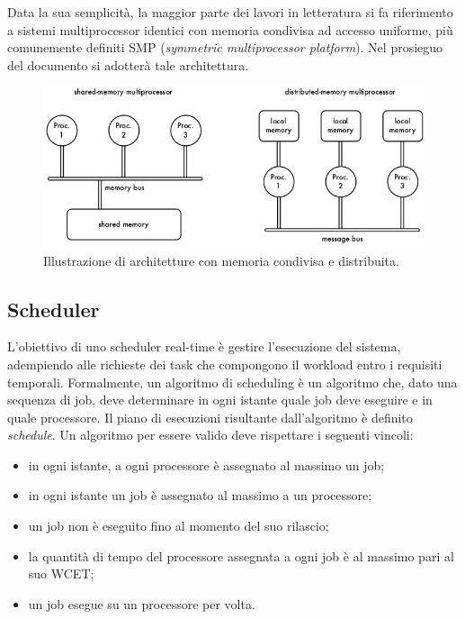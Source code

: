 Data la sua semplicità, la maggior parte dei lavori in letteratura si fa riferimento a sistemi multiprocessor identici con memoria condivisa ad accesso uniforme, più comunemente definiti SMP (\textit{symmetric multiprocessor platform}). Nel prosieguo del documento si adotterà tale architettura.

\begin{figure}
\includegraphics[width=\linewidth]{images/memory_arch.jpeg}
\caption{Illustrazione di architetture con memoria condivisa e distribuita.}
\label{fig:memory}
\end{figure}

\subsection{Scheduler}
\label{sec:overviewSCHED}

L'obiettivo di uno scheduler real-time è gestire l'esecuzione del sistema, adempiendo alle richieste dei task che compongono il workload entro i requisiti temporali. Formalmente, un algoritmo di scheduling è un algoritmo che, dato una sequenza di job, deve determinare in ogni istante quale job deve eseguire e in quale processore. Il piano di esecuzioni risultante dall'algoritmo è definito \textit{schedule}. Un algoritmo per essere valido deve rispettare i seguenti vincoli:\\

\begin{itemize}
	\item in ogni istante, a ogni processore è assegnato al massimo un job; 
	\item in ogni istante un job è assegnato al massimo a un processore;
	\item un job non è eseguito fino al momento del suo rilascio;
	\item la quantità di tempo del processore assegnata a ogni job è al massimo pari al suo WCET;
	\item un job esegue su un processore per volta.
\end{itemize}

